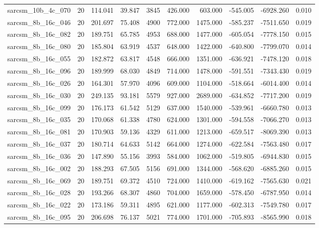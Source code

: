 \begin{tabular}{lrrrrrrrrr}
sarcsm\_10b\_4c\_070 & 20 & 114.041 & 39.847 & 3845 & 426.000 & 603.000 & -545.005 & -6928.260 & 0.010 \\
sarcsm\_8b\_16c\_046 & 20 & 201.697 & 75.408 & 4900 & 772.000 & 1475.000 & -585.237 & -7511.650 & 0.019 \\
sarcsm\_8b\_16c\_082 & 20 & 189.751 & 65.785 & 4953 & 688.000 & 1477.000 & -605.054 & -7778.150 & 0.015 \\
sarcsm\_8b\_16c\_080 & 20 & 185.804 & 63.919 & 4537 & 648.000 & 1422.000 & -640.800 & -7799.070 & 0.014 \\
sarcsm\_8b\_16c\_055 & 20 & 182.872 & 63.817 & 4548 & 666.000 & 1351.000 & -636.921 & -7478.120 & 0.018 \\
sarcsm\_8b\_16c\_096 & 20 & 189.999 & 68.030 & 4849 & 714.000 & 1478.000 & -591.551 & -7343.430 & 0.019 \\
sarcsm\_8b\_16c\_026 & 20 & 164.301 & 57.970 & 4096 & 609.000 & 1104.000 & -518.664 & -6014.400 & 0.014 \\
sarcsm\_8b\_16c\_030 & 20 & 249.135 & 93.181 & 5579 & 927.000 & 2689.000 & -634.852 & -7717.200 & 0.019 \\
sarcsm\_8b\_16c\_099 & 20 & 176.173 & 61.542 & 5129 & 637.000 & 1540.000 & -539.961 & -6660.780 & 0.013 \\
sarcsm\_8b\_16c\_035 & 20 & 170.068 & 61.338 & 4780 & 624.000 & 1301.000 & -594.558 & -7066.270 & 0.013 \\
sarcsm\_8b\_16c\_081 & 20 & 170.903 & 59.136 & 4329 & 611.000 & 1213.000 & -659.517 & -8069.390 & 0.013 \\
sarcsm\_8b\_16c\_037 & 20 & 180.714 & 64.633 & 5142 & 664.000 & 1274.000 & -622.584 & -7563.480 & 0.017 \\
sarcsm\_8b\_16c\_036 & 20 & 147.890 & 55.156 & 3993 & 584.000 & 1062.000 & -519.805 & -6944.830 & 0.015 \\
sarcsm\_8b\_16c\_002 & 20 & 188.293 & 67.505 & 5156 & 691.000 & 1344.000 & -568.620 & -6885.260 & 0.015 \\
sarcsm\_8b\_16c\_069 & 20 & 189.751 & 69.372 & 4510 & 724.000 & 1410.000 & -619.162 & -7565.630 & 0.021 \\
sarcsm\_8b\_16c\_028 & 20 & 193.266 & 68.307 & 4860 & 704.000 & 1659.000 & -578.450 & -6787.950 & 0.014 \\
sarcsm\_8b\_16c\_022 & 20 & 173.186 & 59.311 & 4895 & 621.000 & 1177.000 & -602.313 & -7549.780 & 0.017 \\
sarcsm\_8b\_16c\_095 & 20 & 206.698 & 76.137 & 5021 & 774.000 & 1701.000 & -705.893 & -8565.990 & 0.018 \\

\end{tabular}
